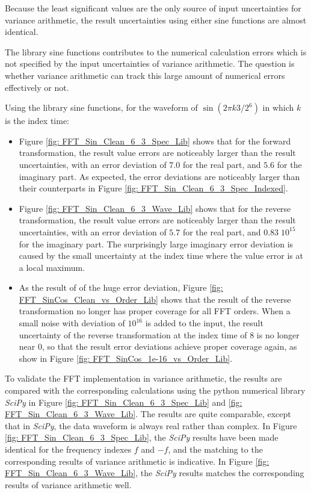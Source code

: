 \documentclass[twoside]{article}
\numberwithin{equation}{section}
\begin{document}
Because the least significant values are the only source of input uncertainties for variance arithmetic, the result uncertainties using either sine functions are almost identical.

The library sine functions contributes to the numerical calculation errors which is not specified by the input uncertainties of variance arithmetic.
The question is whether variance arithmetic can track this large amount of numerical errors effectively or not.

Using the library sine functions, for the waveform of $\sin(2\pi k 3/2^6)$ in which $k$ is the index time:
\begin{itemize}
\item Figure \ref{fig: FFT_Sin_Clean_6_3_Spec_Lib} shows that for the forward transformation, the result value errors are noticeably larger than the result uncertainties, with an error deviation of $7.0$ for the real part, and $5.6$ for the imaginary part.
As expected, the error deviations are noticeably larger than their counterparts in Figure \ref{fig: FFT_Sin_Clean_6_3_Spec_Indexed}.

\item Figure \ref{fig: FFT_Sin_Clean_6_3_Wave_Lib} shows that for the reverse transformation, the result value errors are noticeably larger than the result uncertainties, with an error deviation of $5.7$ for the real part, and $	0.83 \; 10^{15}$ for the imaginary part. 
The surprisingly large imaginary error deviation is caused by the small uncertainty at the index time where the value error is at a local maximum.

\item As the result of of the huge error deviation, Figure \ref{fig: FFT_SinCos_Clean_vs_Order_Lib} shows that the result of the reverse transformation no longer has proper coverage for all FFT orders.
When a small noise with deviation of $10^{16}$ is added to the input, the result uncertainty of the reverse transformation at the index time of $8$ is no longer near $0$, so that the result error deviations achieve proper coverage again, as show in Figure \ref{fig: FFT_SinCos_1e-16_vs_Order_Lib}.

\end{itemize}

To validate the FFT implementation in variance arithmetic, the results are compared with the corresponding calculations using the python numerical library \textit{SciPy} in Figure \ref{fig: FFT_Sin_Clean_6_3_Spec_Lib} and \ref{fig: FFT_Sin_Clean_6_3_Wave_Lib}.
The results are quite comparable, except that in \textit{SciPy}, the data waveform is always real rather than complex.
In Figure \ref{fig: FFT_Sin_Clean_6_3_Spec_Lib}, the \textit{SciPy} results have been made identical for the frequency indexes $f$ and $-f$, and the matching to the corresponding results of variance arithmetic is indicative.
In Figure \ref{fig: FFT_Sin_Clean_6_3_Wave_Lib}, the \textit{SciPy} results matches the corresponding results of variance arithmetic well.
\end{document}
